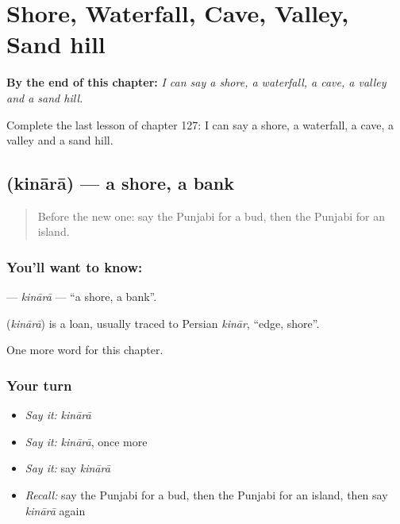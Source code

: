 
\chapter{Shore, Waterfall, Cave, Valley, Sand hill}
\label{ch:pa-shore-waterfall-cave-valley-sand-hill}

\begin{chapteropening}
\textbf{By the end of this chapter:} \emph{I can say a shore, a waterfall, a cave, a valley and a sand hill.}

Complete the last lesson of chapter 127: I can say a shore, a waterfall, a cave, a valley and a sand hill.
\end{chapteropening}

\section[\texorpdfstring{\pa{ਕਿਨਾਰਾ} (kinārā)}{ਕਿਨਾਰਾ (kinārā)}]{ (kinārā) — a shore, a bank}

\label{lesson:PA-C127-kinara}



\begin{quote}
Before the new one: say the Punjabi for a bud, then the Punjabi for an island.
\end{quote}

\subsection*{You'll want to know: }
\textbf{} — \emph{kinārā} — \textquotedblleft{}a shore, a bank\textquotedblright{}.

\begin{cousinweb}
\textbf{} (\emph{kinārā}) is a loan, usually traced to Persian \emph{kinār}, \textquotedblleft{}edge, shore\textquotedblright{}.
\end{cousinweb}

\begin{grammarlens}[title={What you've built}]
One more word for this chapter.
\end{grammarlens}

\subsection*{Your turn}
\begin{itemize}
\raggedright
  \item \emph{Say it:} \emph{kinārā}
  \item \emph{Say it:} \emph{kinārā}, once more
  \item \emph{Say it:} say \emph{kinārā}
  \item \emph{Recall:} say the Punjabi for a bud, then the Punjabi for an island, then say \emph{kinārā} again
\end{itemize}

